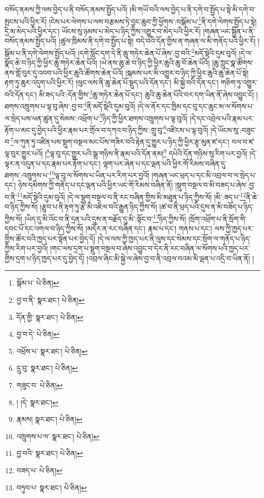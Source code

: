 བསོད་ནམས་ཀྱི་ལས་བྱེད་པ་ནི་བསོད་ནམས་སྤྱོད་པའོ། །མི་གཡོ་བའི་ལས་བྱེད་པ་ནི་དགེ་བ་སྤྱོད་པ་སྟེ་མི་དགེ་བ་སྤངས་པའི་ཕྱིར་རོ། །ངེས་པར་ལེགས་པ་ལས་བརྩམས་ཏེ་བྱང་ཆུབ་ཀྱི་ཕྱོགས་:བསྒོམ་པ་\footnote{སྒོམ་པ་  པེ་ཅིན། }ནི་དགེ་ལེགས་སྤྱོད་པ་སྟེ། དྲི་མ་མེད་པའི་ཕྱིར་དང་། ཡོངས་སུ་ཉམས་པ་མེད་པ་ཉིད་ཀྱིས་འགྱུར་བ་མེད་པའི་ཕྱིར་རོ། །གཞན་ཡང་སྦྱིན་པ་ནི་བསོད་ནམས་སྤྱོད་པའོ། །ཚུལ་ཁྲིམས་ནི་དགེ་བ་སྤྱོད་པ་སྟེ། བདེ་བའི་དོན་གྱིས་ན་གཞན་ལ་མི་གནོད་པའི་ཕྱིར་རོ། །སྒོམ་པ་ནི་དགེ་ལེགས་སྤྱོད་པའོ། །དགེ་སློང་དག་དེ་ནི་ཆུ་གཏེར་ཆེན་པོ་ཞེས་:བྱ་བའི་\footnote{བྱ་བ་ནི་  སྣར་ཐང་།  པེ་ཅིན། }མདོ་སྡེའི་དུམ་བུའོ། །དེ་ལ་སྣོད་ཆེ་བ་ཉིད་ཀྱི་ཕྱིར་ཆུ་གཏེར་ཆེན་པོའོ། །ཡེ་ནས་ཆུ་ཆེ་བ་ཉིད་ཀྱི་ཕྱིར་ཆུའི་ཆུ་བོ་ཆེན་པོའོ། །ཆུ་ཀླུང་སྣ་ཚོགས་ནས་གློ་བུར་དུ་འབབ་པའི་ཕྱིར་ཆུའི་ཚོགས་ཆེན་པོའོ། །སྐམས་པར་མི་འགྱུར་བ་ཉིད་ཀྱི་ཕྱིར་ཆུའི་ཆུ་ཆེན་པོ་སྟེ། རྟག་ཏུ་ཆུར་འདུག་པའི་ཕྱིར་རོ། །ལུང་ལས་ནི་ཆུ་ཆེན་པོ་སྡུད་པའི་དོན་དང་། མི་སྐྱེ་བའི་དོན་དང་། གཅིག་ཏུ་འགྱུར་བའི་དོན་དང་། མི་ཟད་པའི་:དོན་གྱིས་\footnote{དོན་གྱི་  སྣར་ཐང་།  པེ་ཅིན། }ཆུ་གཏེར་ཆེན་པོ་དང་། ཆུའི་ཆུ་ཆེན་པོའི་བར་དག་ཡིན་ནོ་ཞེས་འབྱུང་ངོ། །ཐགས་འཁྲུགས་པ་ལྟ་བུ་ཞེས་:བྱ་བ་\footnote{བྱ་བ་དེ་  པེ་ཅིན། }ནི་མདོ་སྡེའི་དུམ་བུའོ། །དེ་ལ་ནོར་དང་ཁྱིམ་དང་བུ་དང་ཆུང་མ་ལ་སོགས་པ་ལ་སྲེད་པས་ཕན་ཚུན་དུ་སེམས་:འཕྲོག་པ་\footnote{འཕྲོས་པ་  སྣར་ཐང་།  པེ་ཅིན། }ཉིད་ཀྱི་ཕྱིར་ཐགས་འཁྲུགས་པ་ལྟ་བུའོ། །དེ་དང་འབྲེལ་པའི་རྣམ་པར་རྟོག་པ་མང་དུ་བྱེད་པའི་ཕྱིར་རྣམ་པར་གྲོལ་བ་དཀའ་བ་ཉིད་ཀྱིས་:གྲུ་བུ་\footnote{དྲུ་བུ་  སྣར་ཐང་།  པེ་ཅིན། }འཛིངས་པ་ལྟ་བུའོ། །དེ་ཡོངས་སུ་:བཟུང་བ་\footnote{གཟུང་བ་  པེ་ཅིན། }ལ་ཀུན་ཏུ་འཛིན་པས་སྡུག་བསྔལ་མང་པོས་གཟིར་བའི་རྟེན་དུ་གྱུར་པ་ཉིད་ཀྱི་ཕྱིར་རྩྭ་མུན་ཛ་དང་། བལ་བ་ཛ་ལྟ་བུར་གྱུར་པའོ། །\footnote{། །དེ་  སྣར་ཐང་། }ལྟ་བུ་དང་གྱུར་པའི་སྒྲ་གཉིས་ནི་རྣམ་པའི་དོན་ནམ།\footnote{རྣམས།  སྣར་ཐང་།  པེ་ཅིན། } དཔེའི་དོན་གཉིས་སུ་རིག་པར་བྱའོ། །དེ་ལྟར་ན་འདུན་པ་དང་རྣམ་པར་རྟོག་པ་དང་། ལྷག་པར་ཞེན་པ་དང་ལྡན་པའི་ཕྱིར་གོ་རིམས་བཞིན་དུ་ཐགས་:འཁྲུགས་པ་\footnote{འཁྲུགས་པ་ལ་  སྣར་ཐང་།  པེ་ཅིན། }ལྟ་བུ་ལ་སོགས་པ་ཡིན་པར་རིག་པར་བྱའོ། །གཞན་ཡང་ཕྲད་པ་དང་མི་འབྲལ་བ་ལ་སྲེད་པ་དང་། ཉེས་དམིགས་ཀྱི་གནོད་པ་དང་ལྡན་པའི་ཕྱིར་ཡང་གོ་རིམས་བཞིན་ནོ། །སྡུག་བསྔལ་བ་མི་བཟད་པ་ཞེས་:བྱ་བ་ནི་\footnote{བྱ་བའི་  སྣར་ཐང་།  པེ་ཅིན། }མདོ་སྡེའི་དུམ་བུའོ། །དེ་ལ་སྡུག་བསྔལ་བ་ནི་རང་བཞིན་གྱིས་མི་མཐུན་པ་ཉིད་ཀྱིས་སོ། །མི་:ཟད་པ་\footnote{བཟད་པ་  པེ་ཅིན། }ནི་ཆེ་བ་ཉིད་ཀྱིས་སོ། །རྩུབ་པ་ནི་རྟག་ཏུ་རྩེ་མི་འཇིལ་བའི་རྒྱུན་ཉིད་ཀྱིས་སོ། །ཚ་བ་ནི་ཕྲད་པའི་དུས་ན་མི་བཟོད་པ་ཉིད་ཀྱིས་སོ། །ཡིད་དུ་མི་འོང་བ་ནི་དྲན་པའི་དུས་ན་བརྗོད་དུ་མི་:སྟོང་བ་\footnote{བཏུབ་པ་  སྣར་ཐང་།  པེ་ཅིན། }ཉིད་ཀྱིས་སོ། །སྲོག་འཕྲོག་པ་ནི་སྲོག་གི་དབང་པོ་དང་འགལ་བ་ཉིད་ཀྱིས་སོ། །མདོར་ན་རང་བཞིན་དང་། རྣམ་པ་དང་། གནས་པ་དང་། ལས་ཀྱི་ཁྱད་པར་གྱིས་ཚོར་བའི་ཁྱད་པར་སྟོན་པར་བྱེད་དོ། །དེ་ལ་ལས་ཀྱི་ཁྱད་པར་ནི་ལུས་དང་སེམས་དང་སྲོག་ལ་གནོད་པ་ཉིད་ཀྱིས་རིག་པར་བྱའོ། །གང་ལས་དྲག་པ་སྡུག་བསྔལ་བ་ཞེས་འབྱུང་བ་དེར་ནི་རང་བཞིན་ལ་སོགས་པའི་ཁྱད་པར་གྱིས་དྲག་པ་ཉིད་ཁྱད་པར་དུ་བྱེད་དོ། །འབྲལ་ཞིང་མི་སྐྱེ་ལ་ཞེས་བྱ་བ་ནི་འབྲལ་བའམ་མི་ལྡན་པ་འདྲི་བ་ཡིན་ནོ། །
